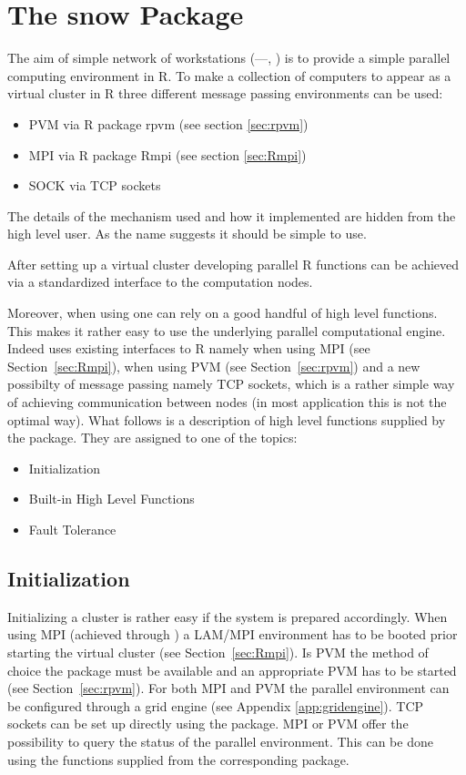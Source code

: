 \section{The snow Package}
\label{sec:snow}
The aim of simple network of workstations
(---\cite{rossini03snow}, \cite{tierney07snow}) is to
provide a simple parallel computing environment in R. To make a
collection of computers to appear as a virtual cluster in R 
three different message passing environments can be used:

\begin{itemize}
\item PVM via R package rpvm (see section \ref{sec:rpvm})
\item MPI via R package Rmpi (see section \ref{sec:Rmpi})
\item SOCK via TCP sockets
\end{itemize}

The details of the mechanism used and how it implemented are hidden
from the high level user. As the name suggests it should be simple to
use.

After setting up a virtual cluster developing parallel R functions
can be achieved via a standardized interface to the computation
nodes.

Moreover, when using  one can rely on a good handful of
high level functions. This makes it rather easy to use the underlying
parallel computational engine.
Indeed  uses existing interfaces to R namely  when
using MPI (see Section~\ref{sec:Rmpi}),  when using PVM (see
Section~\ref{sec:rpvm}) and a new possibilty of message passing namely
TCP sockets, which is a rather simple way of achieving communication
between nodes (in most application this is not the optimal way).
What follows is a description of high level functions supplied by the
 package. They are assigned to one of the topics:

\begin{itemize}
\item Initialization
\item Built-in High Level Functions
\item Fault Tolerance
\end{itemize}

\subsection{Initialization}

Initializing a  cluster is rather easy if the system is
prepared accordingly. When using MPI (achieved through ) a
LAM/MPI environment has to be booted prior starting the virtual
cluster (see Section~\ref{sec:Rmpi}). Is PVM the method of choice the
 package must be available and an appropriate PVM has to be
started (see Section~\ref{sec:rpvm}). For both MPI and PVM the
parallel environment 
can be configured through a grid engine (see Appendix
\ref{app:gridengine}). TCP sockets can be set up directly using the
package. MPI or PVM offer the possibility to query the status of the
parallel environment. This can be done using the functions supplied
from the corresponding package.

